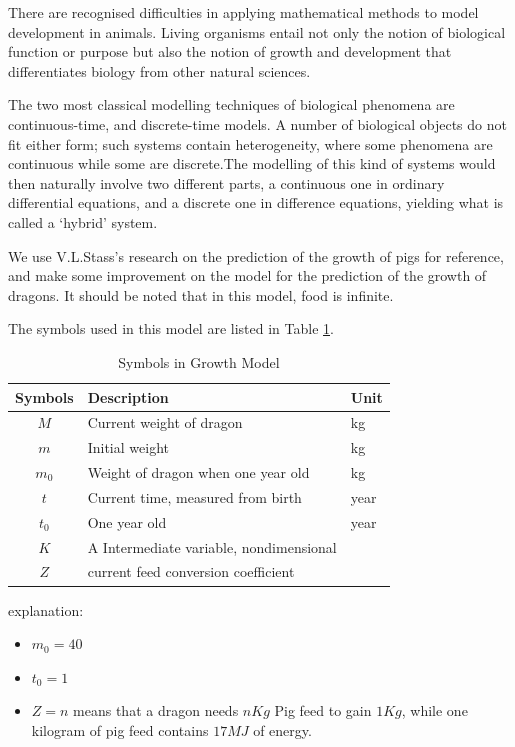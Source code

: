 \documentclass{mcmthesis}
\begin{document}
There are recognised difficulties in applying mathematical methods
to model development in animals. Living organisms entail not only the
notion of biological function or purpose but also the notion of growth and
development that differentiates biology from other natural sciences.

The two most classical modelling techniques of biological
phenomena are continuous-time, and discrete-time models. A number of
biological objects do not fit either form; such systems contain
heterogeneity, where some phenomena are continuous while some are
discrete.The modelling of this kind of systems would then naturally involve
two different parts, a continuous one in ordinary differential equations, and a
discrete one in difference equations, yielding what is called a ‘hybrid’ system. 

We use V.L.Stass's research on the prediction of the growth of pigs for reference, 
and make some improvement on the model for the prediction of the growth of dragons.
It should be noted that in this model, food is infinite.

The symbols used in this model are listed in Table \ref{tb:Variables1}.

\begin{table}[h]
\centering
\caption{Symbols in Growth Model}
\begin{tabular}{cll}
\toprule
\textbf{Symbols}   & \textbf{Description}                                        &\textbf{Unit}    \\
\midrule
$M$                & Current weight of dragon                                    &kg               \\
$m$                & Initial weight                                              &kg               \\
$m_{0}$            & Weight of dragon when one year old                          &kg               \\
$t$                & Current time, measured from birth                           &year             \\
$t_{0}$            & One year old                                                &year             \\
$K$                & A Intermediate variable, nondimensional                     &                 \\
$Z$                & current feed conversion coefficient                         &                 \\
\bottomrule
\end{tabular}\label{tb:Variables1}
\end{table}
explanation:
\begin{itemize}
\item $m_{0}=40$
\item $t_{0}=1$
\item $Z=n$ means that a dragon needs $nKg$ Pig feed to gain $1Kg$, while one kilogram of pig feed contains $17MJ$ of energy.
\end{itemize}
\end{document}
